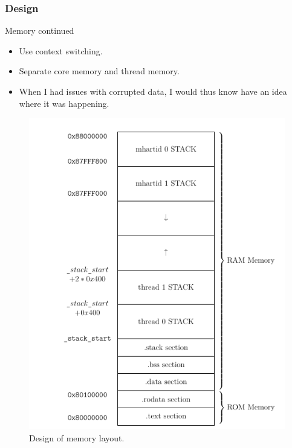 \begin{frame}[hoved]
	\frametitle{Design}
	\begin{minipage}[t]{0.45\textwidth}
		{\large Memory continued}
		\begin{itemize}
			\item Use context switching.
			\item Separate core memory and thread memory.
			\item When I had issues with corrupted data, I would thus know have an
			      idea where it was happening.
		\end{itemize}
	\end{minipage}
	\hfill
	\begin{minipage}[t]{0.45\textwidth}
		\begin{figure}
			\begin{center}
				\includegraphics[height=0.65\textheight]{figures/memory.png}
			\end{center}
			\caption{Design of memory layout.}\label{fig:mem_layout}
		\end{figure}
	\end{minipage}
\end{frame}
